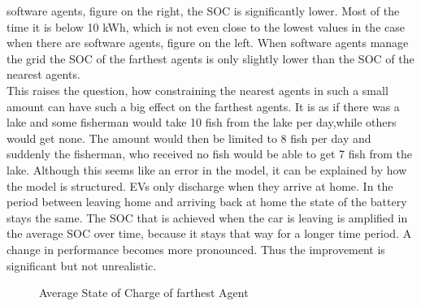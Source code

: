 \documentclass[a4paper]{article}
\begin{document}
software agents, figure on the right, the SOC is significantly lower. Most of the time it is below 10 kWh, which is not even close to 
the lowest values in the case when there are software agents, figure on the left. When software agents manage the grid the SOC of the 
farthest agents is only slightly lower than the SOC of the nearest agents. \\
This raises the question, how constraining the nearest
agents in such a small amount can have such a big effect on the farthest agents.
It is as if there was a lake and some fisherman would take 
10 fish from the lake per day,while others would get none. The amount would then be limited to 8 fish per day and suddenly 
the fisherman, who received no fish would be able to get 7 fish from the lake.
Although this seems like an error in the model, it can 
be explained by how the model is structured. EVs only discharge when they arrive at home. In the period between leaving home and 
arriving back at home the state of the battery stays the same. The SOC that is achieved  when the car is leaving is amplified in the 
average SOC over time, because it stays that way for a longer time period. A change in performance becomes more pronounced. Thus the 
improvement is significant but not unrealistic. 

\begin{figure}[!ht]
\caption{Average State of Charge of farthest Agent}
\label{averages_unconstrained_far}
\end{figure}
\end{document}
